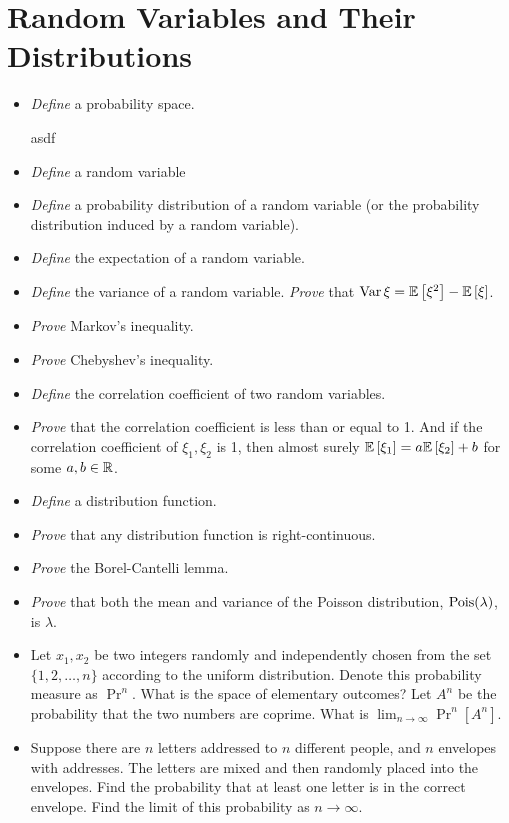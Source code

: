 \documentclass{article}
\newcommand{\cold}{{\color{babyblue}{\Snowflake}}}
\newcommand{\elegant}{{\color{brickred}{\ding{46}}}}
\newcommand{\prac}{{\color{arsenic}{\ding{43}}}}
\begin{document}
\section{Random Variables and Their Distributions}
\begin{itemize}[nosep]
    \item[\cold] \textit{Define} a probability space.
    \begin{answer}
        asdf
    \end{answer}
    \item[\cold] \textit{Define} a random variable
    \item[\cold] \textit{Define} a probability distribution of a random variable (or the probability distribution induced by a random variable).
    \item[\cold] \textit{Define} the expectation of a random variable. 
    \item[\cold] \textit{Define} the variance of a random variable. \textit{Prove} that $\operatorname{Var}{\xi} = \mathbb{E}\left[\xi^2\right] - \mathbb{E}\left[\xi\right]$.
    \item[\prac] \textit{Prove} Markov's inequality.
    \item[\prac] \textit{Prove} Chebyshev's inequality.
    \item[\cold] \textit{Define} the correlation coefficient of two random variables. 
    \item[\prac] \textit{Prove} that the correlation coefficient is less than or equal to 1. And if the correlation coefficient of $\xi_1,\xi_2$ is 1, then almost surely $\mathbb{E}\left[\xi_1\right] = a\mathbb{E}\left[\xi_2\right] + b$ for some $a,b \in \mathbb{R}$. 
    \item[\prac] \textit{Define} a distribution function. 
    \item[\prac] \textit{Prove} that any distribution function is right-continuous.
    \item[\cold] \textit{Prove} the Borel-Cantelli lemma. 
    \item[\prac] \textit{Prove} that both the mean and variance of the Poisson distribution, $\operatorname{Pois}(\lambda)$, is $\lambda$. 
    \item[\elegant] Let $x_1,x_2$ be two integers randomly and independently chosen from the set $\{1,2,\ldots,n\}$ according to the uniform distribution. Denote this probability measure as $\Pr^n$. What is the space of elementary outcomes? Let $A^n$ be the probability that the two numbers are coprime. What is $\lim_{n\to\infty} \Pr^n[A^n]$. 
    \item[\elegant] Suppose there are $n$ letters addressed to $n$ different people, and $n$ envelopes with addresses. The letters are mixed and then randomly placed into the envelopes. Find the probability that at least one letter is in the correct envelope. Find the limit of this probability as $n\to\infty$.
\end{itemize}
\end{document}
